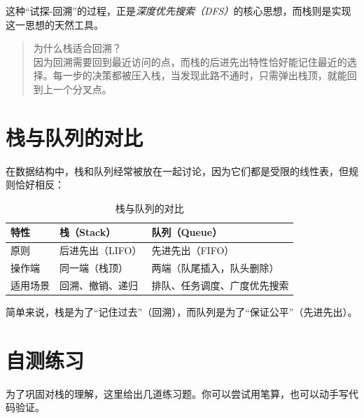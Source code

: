 这种“试探-回溯”的过程，正是\emph{深度优先搜索（DFS）}的核心思想，而栈则是实现这一思想的天然工具。

\begin{quote}
为什么栈适合回溯？\\
因为回溯需要回到最近访问的点，而栈的后进先出特性恰好能记住最近的选择。每一步的决策都被压入栈，当发现此路不通时，只需弹出栈顶，就能回到上一个分叉点。
\end{quote}

\section{栈与队列的对比}

在数据结构中，栈和队列经常被放在一起讨论，因为它们都是受限的线性表，但规则恰好相反：

\begin{table}[h]
\centering
\begin{tabular}{|l|l|l|}
\hline
\textbf{特性} & \textbf{栈（Stack）} & \textbf{队列（Queue）} \\
\hline
原则 & 后进先出（LIFO） & 先进先出（FIFO） \\
操作端 & 同一端（栈顶） & 两端（队尾插入，队头删除） \\
适用场景 & 回溯、撤销、递归 & 排队、任务调度、广度优先搜索 \\
\hline
\end{tabular}
\caption{栈与队列的对比}
\end{table}

简单来说，栈是为了“记住过去”（回溯），而队列是为了“保证公平”（先进先出）。

\section{自测练习}

为了巩固对栈的理解，这里给出几道练习题。你可以尝试用笔算，也可以动手写代码验证。

